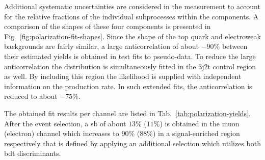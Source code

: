 Additional systematic uncertainties are considered in the measurement to account for the relative fractions of the individual subprocesses within the components. A comparison of the shapes of these four components is presented in Fig.~\ref{fig:polarization-fit-shapes}. Since the \bdttch shape of the top quark and electroweak backgrounds are fairly similar, a large anticorrelation of about $-90\%$ between their estimated yields is obtained in test fits to pseudo-data. To reduce the large anticorrelation the \bdttch distribution is simultaneously fitted in the 3j2t control region as well. By including this region the likelihood is supplied with independent information on the \ttbar production rate. In such extended fits, the anticorrelation is reduced to about $-75\%$.



The obtained fit results per channel are listed in Tab.~\ref{tab:polarization-yields}. After the event selection, a \gls{sb} of about $13\%$ ($11\%$) is obtained in the muon (electron) channel which increases to $90\%$ ($88\%$) in a signal-enriched region respectively that is defined by applying an additional selection which utilizes both \gls{bdt} discriminants.


